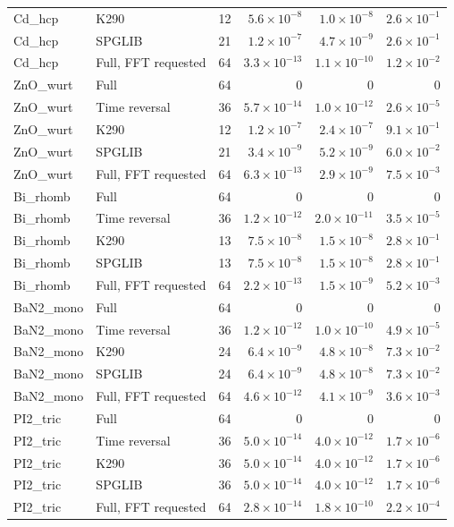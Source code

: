 \begin{table}[htbp]
\begin{tabular}{llrrrr}
Cd\_hcp & K290 & 12 & $5.6\times10^{-8}$ & $1.0\times10^{-8}$ & $2.6\times10^{-1}$ \\
Cd\_hcp & SPGLIB & 21 & $1.2\times10^{-7}$ & $4.7\times10^{-9}$ & $2.6\times10^{-1}$ \\
Cd\_hcp & Full, FFT requested & 64 & $3.3\times10^{-13}$ & $1.1\times10^{-10}$ & $1.2\times10^{-2}$ \\
ZnO\_wurt & Full & 64 & $0$ & $0$ & $0$ \\
ZnO\_wurt & Time reversal & 36 & $5.7\times10^{-14}$ & $1.0\times10^{-12}$ & $2.6\times10^{-5}$ \\
ZnO\_wurt & K290 & 12 & $1.2\times10^{-7}$ & $2.4\times10^{-7}$ & $9.1\times10^{-1}$ \\
ZnO\_wurt & SPGLIB & 21 & $3.4\times10^{-9}$ & $5.2\times10^{-9}$ & $6.0\times10^{-2}$ \\
ZnO\_wurt & Full, FFT requested & 64 & $6.3\times10^{-13}$ & $2.9\times10^{-9}$ & $7.5\times10^{-3}$ \\
Bi\_rhomb & Full & 64 & $0$ & $0$ & $0$ \\
Bi\_rhomb & Time reversal & 36 & $1.2\times10^{-12}$ & $2.0\times10^{-11}$ & $3.5\times10^{-5}$ \\
Bi\_rhomb & K290 & 13 & $7.5\times10^{-8}$ & $1.5\times10^{-8}$ & $2.8\times10^{-1}$ \\
Bi\_rhomb & SPGLIB & 13 & $7.5\times10^{-8}$ & $1.5\times10^{-8}$ & $2.8\times10^{-1}$ \\
Bi\_rhomb & Full, FFT requested & 64 & $2.2\times10^{-13}$ & $1.5\times10^{-9}$ & $5.2\times10^{-3}$ \\
BaN2\_mono & Full & 64 & $0$ & $0$ & $0$ \\
BaN2\_mono & Time reversal & 36 & $1.2\times10^{-12}$ & $1.0\times10^{-10}$ & $4.9\times10^{-5}$ \\
BaN2\_mono & K290 & 24 & $6.4\times10^{-9}$ & $4.8\times10^{-8}$ & $7.3\times10^{-2}$ \\
BaN2\_mono & SPGLIB & 24 & $6.4\times10^{-9}$ & $4.8\times10^{-8}$ & $7.3\times10^{-2}$ \\
BaN2\_mono & Full, FFT requested & 64 & $4.6\times10^{-12}$ & $4.1\times10^{-9}$ & $3.6\times10^{-3}$ \\
PI2\_tric & Full & 64 & $0$ & $0$ & $0$ \\
PI2\_tric & Time reversal & 36 & $5.0\times10^{-14}$ & $4.0\times10^{-12}$ & $1.7\times10^{-6}$ \\
PI2\_tric & K290 & 36 & $5.0\times10^{-14}$ & $4.0\times10^{-12}$ & $1.7\times10^{-6}$ \\
PI2\_tric & SPGLIB & 36 & $5.0\times10^{-14}$ & $4.0\times10^{-12}$ & $1.7\times10^{-6}$ \\
PI2\_tric & Full, FFT requested & 64 & $2.8\times10^{-14}$ & $1.8\times10^{-10}$ & $2.2\times10^{-4}$ \\
\bottomrule
\end{tabular}
\end{table}
